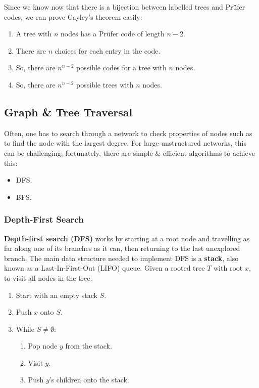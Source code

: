 \documentclass[a4paper,11pt]{article}
\begin{document}
Since we know now that there is a bijection between labelled trees and Pr\"ufer codes, we can prove Cayley's theorem easily:
\begin{enumerate}
    \item   A tree with $n$ nodes has a Pr\"ufer code of length $n-2$.
    \item   There are $n$ choices for each entry in the code.
    \item   So, there are $n^{n-2}$ possible codes for a tree with $n$ nodes.
    \item   So, there are $n^{n-2}$ possible trees with $n$ nodes.
\end{enumerate}

\subsection{Graph \& Tree Traversal}
Often, one has to search through a network to check properties of nodes such as to find the node with the largest degree.
For large unstructured networks, this can be challenging;
fortunately, there are simple \& efficient algorithms to achieve this:
\begin{itemize}
    \item   DFS.
    \item   BFS.
\end{itemize}

\subsubsection{Depth-First Search}
\textbf{Depth-first search (DFS)} works by starting at a root node and travelling as far along one of its branches as it can, then returning to the last unexplored branch.
The main data structure needed to implement DFS is a \textbf{stack}, also known as a Last-In-First-Out (LIFO) queue.
Given a rooted tree $T$ with root $x$, to visit all nodes in the tree:
\begin{enumerate}
    \item   Start with an empty stack $S$.
    \item   Push $x$ onto $S$.
    \item   While $S \neq \emptyset$:
            \begin{enumerate}[label=\arabic*.]
                \item   Pop node $y$ from the stack.
                \item   Visit $y$.
                \item   Push $y$'s children onto the stack.
            \end{enumerate}
\end{enumerate}
\end{document}
